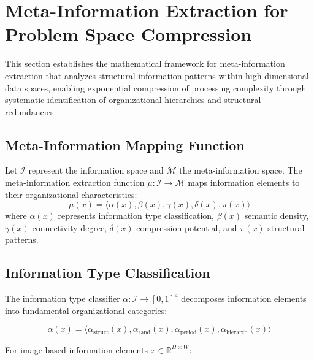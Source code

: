 \section{Meta-Information Extraction for Problem Space Compression}
\label{sec:meta-information-extraction}

This section establishes the mathematical framework for meta-information extraction that analyzes structural information patterns within high-dimensional data spaces, enabling exponential compression of processing complexity through systematic identification of organizational hierarchies and structural redundancies.

\subsection{Meta-Information Mapping Function}

\begin{definition}
Let $\mathcal{I}$ represent the information space and $\mathcal{M}$ the meta-information space. The meta-information extraction function $\mu: \mathcal{I} \to \mathcal{M}$ maps information elements to their organizational characteristics:
\begin{equation}
\mu(x) = \langle \alpha(x), \beta(x), \gamma(x), \delta(x), \pi(x) \rangle
\label{eq:meta-information-function}
\end{equation}
where $\alpha(x)$ represents information type classification, $\beta(x)$ semantic density, $\gamma(x)$ connectivity degree, $\delta(x)$ compression potential, and $\pi(x)$ structural patterns.
\end{definition}

\subsection{Information Type Classification}

The information type classifier $\alpha: \mathcal{I} \to [0,1]^4$ decomposes information elements into fundamental organizational categories:

\begin{equation}
\alpha(x) = \langle \alpha_{\text{struct}}(x), \alpha_{\text{rand}}(x), \alpha_{\text{period}}(x), \alpha_{\text{hierarch}}(x) \rangle
\label{eq:info-type-classification}
\end{equation}

For image-based information elements $x \in \mathbb{R}^{H \times W}$:


